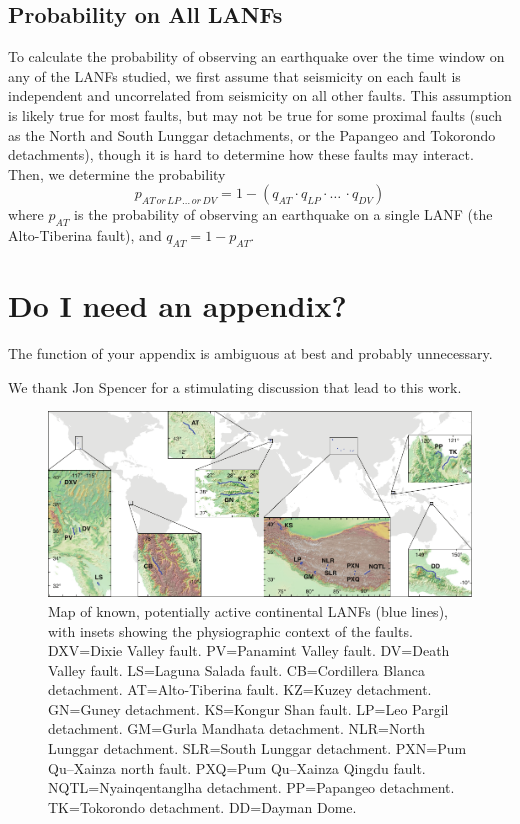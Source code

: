 \documentclass[twocolumn,grl]{AGUTeX}
\begin{document}
\begin{article}
\subsection{Probability on All LANFs}
To calculate the probability of observing an earthquake over the time window on any of the LANFs studied, we first assume that seismicity on each fault is independent and uncorrelated from seismicity on all other faults. This assumption is likely true for most faults, but may not be true for some proximal faults (such as the North and South Lunggar detachments, or the Papangeo and Tokorondo detachments), though it is hard to determine how these faults may interact.  Then, we determine the probability  
\begin{equation}
p_{AT \, or \, LP\, \ldots \, or \, DV} = 1 - (q_{AT} \cdot q_{LP} \cdot \ldots \, \cdot q_{DV})
\end{equation}
where $p_{AT}$ is the probability of observing an earthquake on a single LANF (the Alto-Tiberina fault), and $q_{AT} = 1 - p_{AT}$.

\appendix
\section{Do I need an appendix?}
The function of your appendix is ambiguous at best and probably unnecessary.

\begin{acknowledgments}
We thank Jon Spencer for a stimulating discussion that lead to this work.

\end{acknowledgments}

\end{article}

\begin{figure}
\noindent\includegraphics[width=40pc]{figures/active_lanfs_map_insets.pdf}
\caption{Map of known, potentially active continental LANFs (blue lines), with insets showing the physiographic context of the faults.  DXV=Dixie Valley fault.  PV=Panamint Valley fault.  DV=Death Valley fault.  LS=Laguna Salada fault.  CB=Cordillera Blanca detachment.  AT=Alto-Tiberina fault.  KZ=Kuzey detachment.  GN=Guney detachment.  KS=Kongur Shan fault.  LP=Leo Pargil detachment.  GM=Gurla Mandhata detachment. NLR=North Lunggar detachment.  SLR=South Lunggar detachment.  PXN=Pum Qu--Xainza north fault.  PXQ=Pum Qu--Xainza Qingdu fault.  NQTL=Nyainqentanglha detachment.  PP=Papangeo detachment.  TK=Tokorondo detachment.  DD=Dayman Dome.}
\label{fig:lanf_map}
\end{figure}
\end{document}
